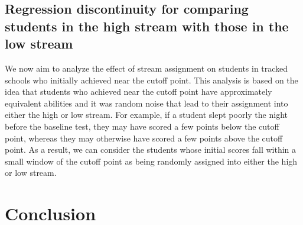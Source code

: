 \documentclass[11pt]{article}
\begin{document}
 \subsection{Regression discontinuity for comparing students in the high stream with those in the low stream}
We now aim to analyze the effect of stream assignment on students in tracked schools who initially achieved near the cutoff point. This analysis is based on the idea that students who achieved near the cutoff point have approximately equivalent abilities and it was random noise that lead to their assignment into either the high or low stream. For example, if a student slept poorly the night before the baseline test, they may have scored a few points below the cutoff point, whereas they may otherwise have scored a few points above the cutoff point. As a result, we can consider the students whose initial scores fall within a small window of the cutoff point as being randomly assigned into either the high or low stream.
 
 
 
 \section{Conclusion}
 
 
 

 
\end{document}
